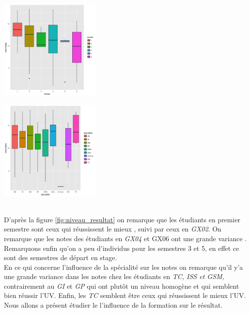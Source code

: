 \documentclass[10pt]{article}
\begin{document}
	\begin{minipage}{.5\textwidth}
		\includegraphics[width=50mm]{Figures/Notes/niveau_resultat.png}
		\label{fig:niveau_resultat}
	\end{minipage}%
	\hspace{0.02\linewidth}
	\begin{minipage}{.5\textwidth}
		\includegraphics[width=50mm]{Figures/Notes/specialite_resultat.png}
		\label{fig:specialite_resultat}
	\end{minipage}
\vspace{0.2mm}
\\D'après la figure \ref{fig:niveau_resultat} on remarque que les étudiants en premier semestre sont ceux qui réussissent le mieux , suivi par ceux en \textit{GX02}. On remarque que les notes des étudiants en \textit{GX04} et GX06 ont une grande variance . Remarquons enfin qu'on a peu d'individus pour les semestres 3 et 5, en effet ce sont des semestres de départ en stage. \\
	En ce qui concerne l'influence de la spécialité sur les notes on remarque qu'il y'a une grande variance dans les notes chez les étudiants en \textit{TC, ISS et GSM,} contrairement au \textit{GI} et \textit{GP} qui ont plutôt un niveau homogène et qui semblent bien réussir l'UV. Enfin, les \textit{TC} semblent être  ceux qui réussissent le mieux l'UV. Nous allons a présent étudier le l'influence de la formation sur le résultat.
\end{document}
